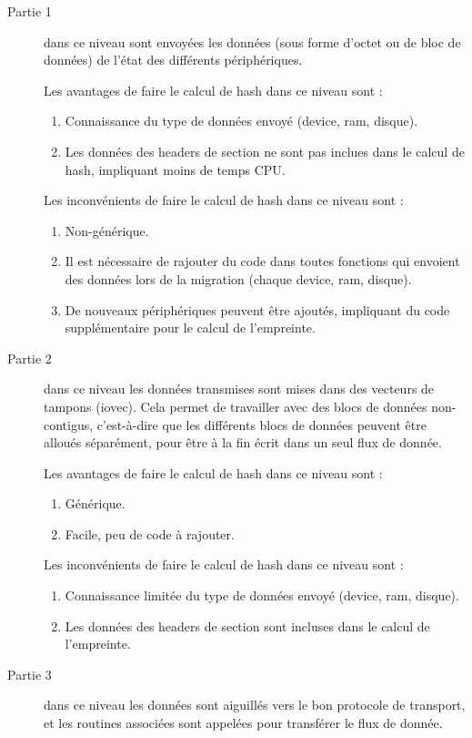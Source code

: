 \begin{description}
    \item[Partie 1] dans ce niveau sont envoyées les données (sous forme d'octet ou de bloc de données) de l'état des différents périphériques.
    
    Les avantages de faire le calcul de hash dans ce niveau sont :
    \begin{enumerate}
    \item Connaissance du type de données envoyé (device, ram, disque).
    \item Les données des headers de section ne sont pas inclues dans le calcul de hash, impliquant moins de temps CPU.
    \end{enumerate}
    Les inconvénients de faire le calcul de hash dans ce niveau sont :
    \begin{enumerate}
    \item Non-générique.
    \item Il est nécessaire de rajouter du code dans toutes fonctions qui envoient des données lors de la migration (chaque device, ram, disque).
    \item De nouveaux périphériques peuvent être ajoutés, impliquant du code supplémentaire pour le calcul de l'empreinte.
    \end{enumerate}
    
    \item[Partie 2] dans ce niveau les données transmises sont mises dans des vecteurs de tampons (iovec).
    Cela permet de travailler avec des blocs de données non-contigus, c'est-à-dire que les différents blocs de données peuvent être alloués séparément, pour être à la fin écrit dans un seul flux de donnée.
    
    Les avantages de faire le calcul de hash dans ce niveau sont :
    \begin{enumerate}
    \item Générique.
    \item Facile, peu de code à rajouter.
    \end{enumerate}
    Les inconvénients de faire le calcul de hash dans ce niveau sont :
    \begin{enumerate}
    \item Connaissance limitée du type de données envoyé (device, ram, disque).
    \item Les données des headers de section sont incluses dans le calcul de l'empreinte.
    \end{enumerate}
    \item[Partie 3] dans ce niveau les données sont aiguillés vers le bon protocole de transport, et les routines associées sont appelées pour transférer le flux de donnée.
    

\end{description}
